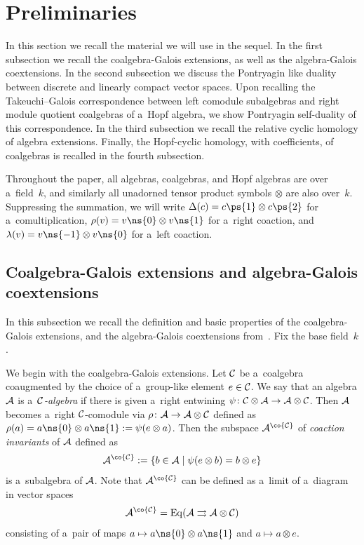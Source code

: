 \section{Preliminaries}

In this section we recall the material we will use in the sequel.
In the f\/irst subsection we recall the coalgebra-Galois extensions, as well as the algebra-Galois coextensions.
In the second subsection we discuss the Pontryagin like duality between discrete and linearly compact vector spaces.
Upon recalling the Takeuchi--Galois correspondence between left comodule subalgebras and right module quotient
coalgebras of a~Hopf algebra, we show Pontryagin self-duality of this correspondence.
In the third subsection we recall the relative cyclic homology of algebra extensions.
Finally, the Hopf-cyclic homology, with coef\/f\/icients, of coalgebras is recalled in the fourth subsection.

Throughout the paper, all algebras, coalgebras, and Hopf algebras are over a~f\/ield~$k$, and similarly all unadorned
tensor product symbols $\otimes$ are also over~$k$.
Suppressing the summation, we will write $\Delta(c)=c\ps{1}\otimes c\ps{2}$ for a~comultiplication,
$\rho(v)=v\ns{0}\otimes v\ns{1}$ for a~right coaction, and $\lambda(v)=v\ns{-1}\otimes v\ns{0}$ for a~left coaction.

\subsection{Coalgebra-Galois extensions and algebra-Galois coextensions}

In this subsection we recall the def\/inition and basic properties of the coalgebra-Galois extensions, and the
algebra-Galois coextensions from~\cite{BrzeHaja99,BrzeHaja09}.
Fix the base f\/ield~$k$.

We begin with the coalgebra-Galois extensions.
Let ${\cal C}$ be a~coalgebra coaugmented by the choice of a~group-like element $e\in {\cal C}$.
We say that an algebra ${\cal A}$ is a~\emph{${\cal C}$-algebra} if there is given a~right entwining $\psi\colon  {\cal
C}\otimes {\cal A}\rightarrow {\cal A}\otimes {\cal C}$.
Then ${\cal A}$ becomes a~right ${\cal C}$-comodule via $\rho\colon {\cal A} \to {\cal A} \otimes {\cal C}$ def\/ined as
$\rho(a) =a\ns{0} \otimes a\ns{1}:=\psi(e\otimes a)$.
Then the subspace ${\cal A}^{\co {\cal C}}$ of \emph{coaction invariants} of ${\cal A}$ def\/ined as
\begin{gather*}
{\cal A}^{\co {\cal C}}:=\{b \in {\cal A} \mid \psi(e\otimes b)=b\otimes e\}
\end{gather*}
is a~subalgebra of ${\cal A}$.
Note that ${\cal A}^{\co {\cal C}}$ can be def\/ined as a~limit of a~diagram in vector spaces
\begin{gather*}
{\cal A}^{\co{\cal C}}={\rm Eq}({\cal A}\rightrightarrows {\cal A}\otimes {\cal C})
\end{gather*}
consisting of a~pair of maps $a\mapsto a\ns{0} \otimes a\ns{1}$ and $a\mapsto a\otimes e$.

